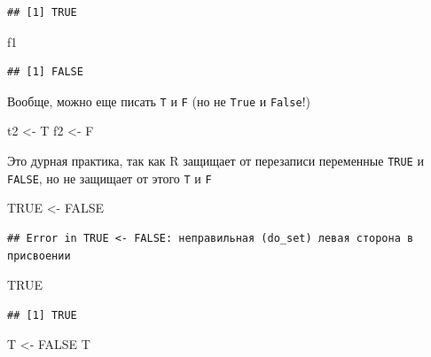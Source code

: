 \documentclass[]{book}
\newenvironment{Shaded}{\begin{snugshade}}{\end{snugshade}}
\newcommand{\StringTok}[1]{\textcolor[rgb]{0.31,0.60,0.02}{#1}}
\newcommand{\OtherTok}[1]{\textcolor[rgb]{0.56,0.35,0.01}{#1}}
\newcommand{\NormalTok}[1]{#1}
\begin{document}
\begin{verbatim}
## [1] TRUE
\end{verbatim}

\begin{Shaded}
\begin{Highlighting}[]
\NormalTok{f1}
\end{Highlighting}
\end{Shaded}

\begin{verbatim}
## [1] FALSE
\end{verbatim}

Вообще, можно еще писать \texttt{T} и \texttt{F} (но не \texttt{True} и
\texttt{False}!)

\begin{Shaded}
\begin{Highlighting}[]
\NormalTok{t2 <-}\StringTok{ }\NormalTok{T}
\NormalTok{f2 <-}\StringTok{ }\NormalTok{F}
\end{Highlighting}
\end{Shaded}

Это дурная практика, так как R защищает от перезаписи переменные
\texttt{TRUE} и \texttt{FALSE}, но не защищает от этого \texttt{T} и
\texttt{F}

\begin{Shaded}
\begin{Highlighting}[]
\OtherTok{TRUE}\NormalTok{ <-}\StringTok{ }\OtherTok{FALSE}
\end{Highlighting}
\end{Shaded}

\begin{verbatim}
## Error in TRUE <- FALSE: неправильная (do_set) левая сторона в присвоении
\end{verbatim}

\begin{Shaded}
\begin{Highlighting}[]
\OtherTok{TRUE}
\end{Highlighting}
\end{Shaded}

\begin{verbatim}
## [1] TRUE
\end{verbatim}

\begin{Shaded}
\begin{Highlighting}[]
\NormalTok{T <-}\StringTok{ }\OtherTok{FALSE}
\NormalTok{T}
\end{Highlighting}
\end{Shaded}
\end{document}
